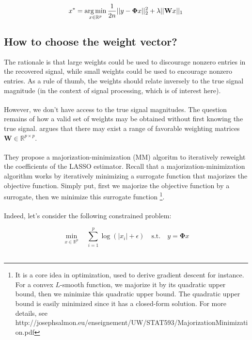\documentclass[a4paper,10pt]{article}
\theoremstyle{definition}
\begin{document}
\begin{equation*}
    x^* = \operatorname*{arg\,min}_{x \in \mathbb{R}^p} \frac{1}{2n} \lvert\lvert y - \mathbf{\Phi}x \rvert\rvert_2^2 + \lambda \lvert\vert \mathbf{W}x \rvert\rvert_1
\end{equation*}

\subsection*{How to choose the weight vector?}

The rationale is that large weights could be used to discourage nonzero entries in the recovered signal, while small weights could be used to encourage nonzero entries. As a rule of thumb, the weights should relate inversely
to the true signal magnitude (in the context of signal processing, which is of interest here).
\\
\\
However, we don't have access to the true signal magnitudes. The question remains of how a valid set of weights may be obtained without first knowing the true signal. \cite{Candes_Wakin_Boyd08} argues that there may exist a range of
favorable weighting matrices $\mathbf{W} \in \mathbb{R}^{p \times p}$.
\\
\\
They propose a majorization-minimization (MM) algoritm to iteratively reweight the coefficients of the LASSO estimator. Recall that a majorization-minimization algorithm works by iteratively minimizing a surrogate function that majorizes the
objective function. Simply put, first we majorize the objective function by a surrogate, then we minimize this surrogate function \footnote{It is a core idea in optimization, used to derive gradient descent for instance. For a convex $L$-smooth function,
we majorize it by its quadratic upper bound, then we minimize this quadratic upper bound. The quadratic upper bound is easily minimized since it has a closed-form solution. For more details, see http://josephsalmon.eu/enseignement/UW/STAT593/MajorizationMinimization.pdf}.
\\
\\
Indeed, let's consider the following constrained problem:

\begin{equation*}
    \min_{x \in \mathbb{R}^p} \quad  \sum_{i=1}^p \log(\lvert x_i \rvert + \epsilon) \quad \textrm{s.t.} \quad  y = \mathbf{\Phi} x
\end{equation*}
\\
\end{document}
